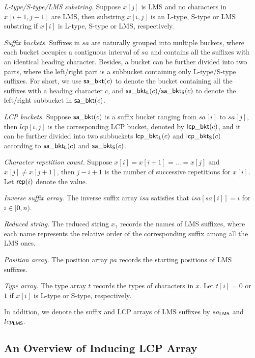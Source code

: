 \documentclass[10pt,journal,compsoc]{IEEEtran}
\begin{document}
	{\em L-type/S-type/LMS substring.} Suppose $x[j]$ is LMS and no characters in $x[i + 1, j - 1]$ are LMS, then substring $x[i, j]$ is an L-type, S-type or LMS substring if $x[i]$ is L-type, S-type or LMS, respectively.
	
	{\em Suffix buckets.} Suffixes in $sa$ are naturally grouped into multiple buckets, where each bucket occupies a contiguous interval of $sa$ and contains all the suffixes with an identical heading character. Besides, a bucket can be further divided into two parts, where the left/right part is a subbucket containing only L-type/S-type suffixes. For short, we use ${\sf sa\_bkt}(c)$ to denote the bucket containing all the suffixes with a heading character $c$, and ${\sf sa\_bkt_L}(c)/{\sf sa\_bkt_S}(c)$ to denote the left/right subbucket in ${\sf sa\_bkt}(c)$.
	
	{\em LCP buckets.} Suppose ${\sf sa\_bkt}(c)$ is a suffix bucket ranging from $sa[i]$ to $sa[j]$, then $lcp[i, j]$ is the corresponding LCP bucket, denoted by ${\sf lcp\_bkt}(c)$, and it can be further divided into two subbuckets ${\sf lcp\_bkt_L}(c)$ and ${\sf lcp\_bkt_S}(c)$ according to ${\sf sa\_bkt_L}(c)$ and ${\sf sa\_bkt_S}(c)$.
	
	{\em Character repetition count.} Suppose $x[i] = x[i + 1] = \dots = x[j]$ and $x[j] \ne x[j + 1]$, then $j - i + 1$ is the number of successive repetitions for $x[i]$. Let ${\sf rep}(i)$ denote the value.
	
	
	{\em Inverse suffix array.} The inverse suffix array $isa$ satisfies that $isa[sa[i]] = i$ for $i \in [0, n)$.
	
	{\em Reduced string.} The reduced string $x_1$ records the names of LMS suffixes, where each name represents the relative order of the corresponding suffix among all the LMS ones.
	
	{\em Position array.} The position array $pa$ records the starting positions of LMS suffixes.	
	
	{\em Type array.} The type array $t$ records the types of characters in $x$. Let $t[i] = 0$ or $1$ if $x[i]$ is L-type or S-type, respectively.
	
	In addition, we denote the suffix and LCP arrays of LMS suffixes by $sa_{\sf LMS}$ and $lcp_{\sf LMS}$.
	
	\subsection{An Overview of Inducing LCP Array} \label{sec:method2:overview}
	
\end{document}
